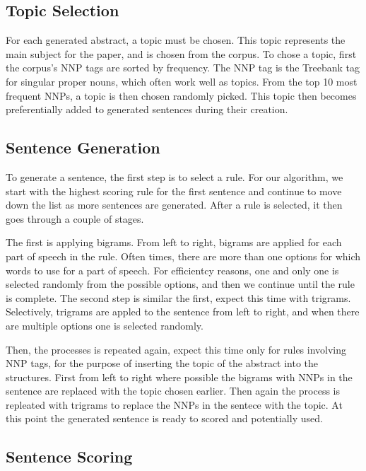 \documentclass[letterpaper, 10 pt, conference]{ieeeconf}  %
\begin{document}
\subsection{Topic Selection}

For each generated abstract, a topic must be chosen. This topic represents the main subject for the paper, and is chosen from the corpus. To chose a topic, first the corpus's NNP tags are sorted by frequency. The NNP tag is the Treebank tag for singular proper nouns, which often work well as topics. From the top 10 most frequent NNPs, a topic is then chosen randomly picked. This topic then becomes preferentially added to generated sentences during their creation.

\subsection{Sentence Generation}

To generate a sentence, the first step is to select a rule. For our algorithm, we start with the highest scoring rule for the first sentence and continue to move down the list as more sentences are generated. After a rule is selected, it then goes through a couple of stages.

The first is applying bigrams. From left to right, bigrams are applied for each part of speech in the rule. Often times, there are more than one options for which words to use for a part of speech. For efficientcy reasons, one and only one is selected randomly from the possible options, and then we continue until the rule is complete. The second step is similar the first, expect this time with trigrams. Selectively, trigrams are appled to the sentence from left to right, and when there are multiple options one is selected randomly.

Then, the processes is repeated again, expect this time only for rules involving NNP tags, for the purpose of inserting the topic of the abstract into the structures. First from left to right where possible the bigrams with NNPs in the sentence are replaced with the topic chosen earlier. Then again the process is repleated with trigrams to replace the NNPs in the sentece with the topic. At this point the generated sentence is ready to scored and potentially used.

\subsection{Sentence Scoring}
\end{document}
